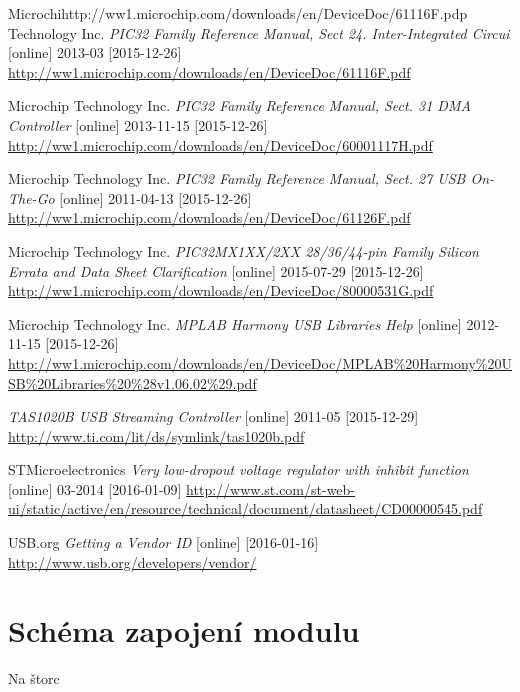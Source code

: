 \documentclass[bc,male,c,dept460]{diploma}						%
\begin{document}
\begin{thebibliography}{99}
 Microchihttp://ww1.microchip.com/downloads/en/DeviceDoc/61116F.pdp Technology Inc.
\textit{PIC32 Family Reference Manual,  Sect 24. Inter-Integrated Circui} [online] 2013-03 [2015-12-26]
\url{http://ww1.microchip.com/downloads/en/DeviceDoc/61116F.pdf}

 Microchip Technology Inc.
\textit{PIC32 Family Reference Manual, Sect. 31 DMA Controller} [online] 2013-11-15 [2015-12-26]
\url{http://ww1.microchip.com/downloads/en/DeviceDoc/60001117H.pdf}

 Microchip Technology Inc.
\textit{PIC32 Family Reference Manual, Sect. 27 USB On-The-Go} [online] 2011-04-13 [2015-12-26]
\url{http://ww1.microchip.com/downloads/en/DeviceDoc/61126F.pdf}

 Microchip Technology Inc.
\textit{PIC32MX1XX/2XX 28/36/44-pin Family Silicon Errata and Data Sheet Clarification} [online] 2015-07-29 [2015-12-26]
\url{http://ww1.microchip.com/downloads/en/DeviceDoc/80000531G.pdf}

 Microchip Technology Inc.
\textit{MPLAB Harmony USB Libraries Help} [online] 2012-11-15 [2015-12-26]
\url{http://ww1.microchip.com/downloads/en/DeviceDoc/MPLAB\%20Harmony\%20USB\%20Libraries\%20\%28v1.06.02\%29.pdf}

\textit{TAS1020B USB Streaming Controller} [online] 2011-05 [2015-12-29]
\url{http://www.ti.com/lit/ds/symlink/tas1020b.pdf} 

 STMicroelectronics
\textit{Very low-dropout voltage regulator with inhibit function} [online] 03-2014 [2016-01-09]
\url{http://www.st.com/st-web-ui/static/active/en/resource/technical/document/datasheet/CD00000545.pdf}

 USB.org
\textit{Getting a Vendor ID} [online] [2016-01-16]
\url{http://www.usb.org/developers/vendor/}


\end{thebibliography}




\appendix

\section{Schéma zapojení modulu}
\begin{landscape}
Na štorc
\end{landscape}

\clearpage

\end{document}
